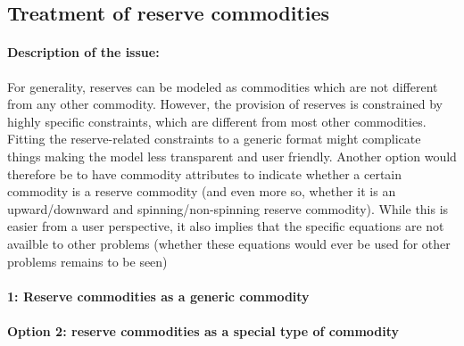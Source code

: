 
\subsection{Treatment of reserve commodities}

\paragraph{Description of the issue:} For generality, reserves can be modeled as commodities which are not different from any other commodity. However, the provision of reserves is constrained by highly specific constraints, which are different from most other commodities. Fitting the reserve-related constraints to a generic format might complicate things making the model less transparent and user friendly. Another option would therefore be to have commodity attributes to indicate whether a certain commodity is a reserve commodity (and even more so, whether it is an upward/downward and spinning/non-spinning reserve commodity). While this is easier from a user perspective, it also implies that the specific equations are not availble to other problems (whether these equations would ever be used for other problems remains to be seen)


\paragraph{1: Reserve commodities as a generic commodity}





\paragraph{Option 2: reserve commodities as a special type of commodity}